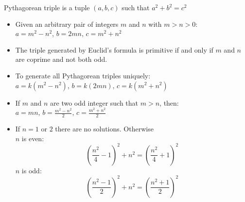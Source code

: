 Pythagorean triple is a tuple $(a, b, c)$ such that $a^2+b^2=c^2$
\begin{itemize}
    \item Given an arbitrary pair of integers $m$ and $n$ with $m > n > 0$:\\
    $a = m^2 - n^2$, $b = 2mn$, $c = m^2 + n^2$
    \item The triple generated by Euclid's formula is primitive if and only if $m$ and $n$ are coprime and not both odd.
    \item To generate all Pythagorean triples uniquely:\\
    $a = k (m^2 - n^2)$, $b = k(2mn)$, $c = k(m^2 + n^2)$
    \item If $m$ and $n$ are two odd integer such that $m > n$, then:\\
    $a = mn$, $b = \frac{m^2 - n^2}{2}$, $c = \frac{m^2 + n^2}{2}$
    \item If $n=1$ or $2$ there are no solutions. Otherwise\\
    $n$ is even: $$\left(\frac{n^2}{4} - 1\right)^2 + n^2 = \left(\frac{n^2}{4} + 1\right)^2$$
    $n$ is odd: $$(\frac{n^2 - 1}{2})^2 + n^2 = (\frac{n^2 + 1}{2})^2$$
\end{itemize}